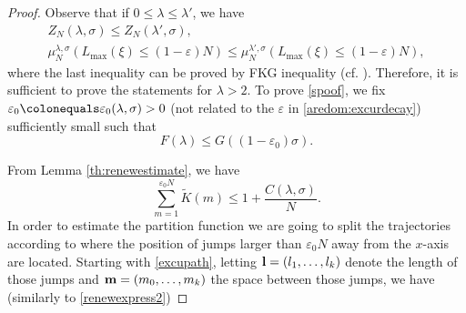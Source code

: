 \documentclass[reqno,11pt]{amsart}
\numberwithin{equation}{section}
\newcommand{\gep}{\varepsilon}       %
\newcommand{\gl}{\lambda}
\newcommand{\gs}{\sigma}
\renewcommand{\tilde}{\widetilde}
\begin{document}
\begin{proof} 
 Observe that  if $0 \le \gl \le \gl'$, we have
\begin{equation}
\begin{gathered}
Z_N(\gl, \gs) \le Z_N(\gl', \gs),\\
\mu^{\gl,\sigma}_{N}( L_{\max}(\xi)\le (1-\gep) N ) \le  \mu^{\gl',\sigma}_{N}( L_{\max}(\xi)\le (1-\gep) N ),
\end{gathered}
\end{equation}
where the last inequality can be proved by FKG inequality (cf. \cite[Lemma 3.3]{lacoin2016mixing}).
Therefore, it is sufficient to prove the statements for $\gl>2$.
To prove \eqref{spoof}, we  fix $\gep_0 \colonequals \gep_0 (\gl, \gs)>0$ (not related to the $\gep$ in \eqref{aredom:excurdecay}) sufficiently small such that
\begin{equation}\label{choosegep}
F(\gl) \le G((1-\gep_0)\gs).
\end{equation}

From Lemma \ref{th:renewestimate}, we have
\begin{equation}
\sum_{m=1}^{\gep_0 N} \tilde K(m) \le 1+\frac{C(\gl, \gs)}{N}.
\end{equation}
In order to estimate the partition function we are going to split the trajectories according to where the position of jumps larger than $\gep_0 N$  away from the $x$-axis are located. Starting with \eqref{excupath}, letting ${\bf l}=(l_1, \dots, l_k)$ denote the length of those jumps and ${\bf m}=(m_0,\dots, m_k)$ the space between those jumps, we have (similarly to \eqref{renewexpress2})


\end{proof}
\end{document}

